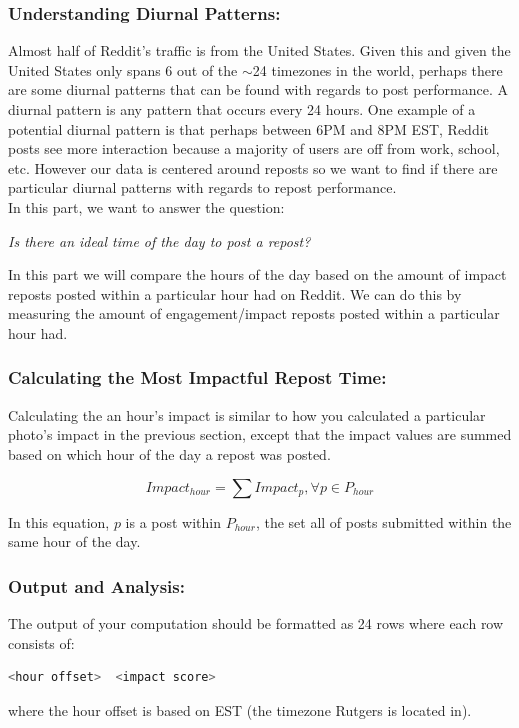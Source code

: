 \documentclass{article}
\begin{document}
\subsubsection*{Understanding Diurnal Patterns:}
Almost half of Reddit's traffic is from the United States. Given this and given the United States only spans 6 out of the $\sim$24 timezones in the world, perhaps there are some diurnal patterns that can be found with regards to post performance. A diurnal pattern is any pattern that occurs every 24 hours. One example of a potential diurnal pattern is that perhaps between 6PM and 8PM EST, Reddit posts see more interaction because a majority of users are off from work, school, etc. However our data is centered around reposts so we want to find if there are particular diurnal patterns with regards to repost performance.\\

\noindent In this part, we want to answer the question:

\begin{center}
    \textit{Is there an ideal time of the day to post a repost?}
\end{center}

\noindent In this part we will compare the hours of the day based on the amount of impact reposts posted within a particular hour had on Reddit. We can do this by measuring the amount of engagement/impact reposts posted within a particular hour had.


\subsubsection*{Calculating the Most Impactful Repost Time:}
Calculating the an hour's impact is similar to how you calculated a particular photo's impact in the previous section, except that the impact values are summed based on which hour of the day a repost was posted.

$$Impact_{hour} = \sum Impact_{p}, \forall p \in P_{hour}$$

\noindent In this equation, $p$ is a post within $P_{hour}$, the set all of posts submitted within the same hour of the day.


\subsubsection*{Output and Analysis:}
The output of your computation should be formatted as 24 rows where each row consists of:
\begin{lstlisting}[language=bash]
                    <hour offset>  <impact score>
\end{lstlisting}
where the hour offset is based on EST (the timezone Rutgers is located in). \\
\end{document}
